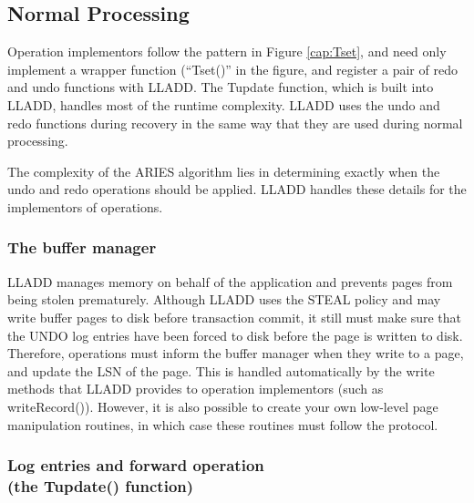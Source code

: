 \documentclass[letterpaper,english]{article}
\begin{document}
\begin{enumerate}
\begin{enumerate}
\begin{enumerate}
\subsection{Normal Processing}

Operation implementors follow the pattern in Figure \ref{cap:Tset},
and need only implement a wrapper function (``Tset()'' in the figure,
and register a pair of redo and undo functions with LLADD.
The Tupdate function, which is built into LLADD, handles most of the
runtime complexity.  LLADD uses the undo and redo functions
during recovery in the same way that they are used during normal
processing.  

The complexity of the ARIES algorithm lies in determining
exactly when the undo and redo operations should be applied.  LLADD 
handles these details for the implementors of operations.


\subsubsection{The buffer manager}

LLADD manages memory on behalf of the application and prevents pages
from being stolen prematurely. Although LLADD uses the STEAL policy
and may write buffer pages to disk before transaction commit, it still
must make sure that the UNDO log entries have been forced to disk
before the page is written to disk. Therefore, operations must inform
the buffer manager when they write to a page, and update the LSN of
the page. This is handled automatically by the write methods that LLADD 
provides to operation implementors (such as writeRecord()). However,
it is also possible to create your own low-level page manipulation
routines, in which case these routines must follow the protocol.


\subsubsection{Log entries and forward operation\\ (the Tupdate() function)\label{sub:Tupdate}}


\end{enumerate}
\end{enumerate}
\end{enumerate}
\end{document}
